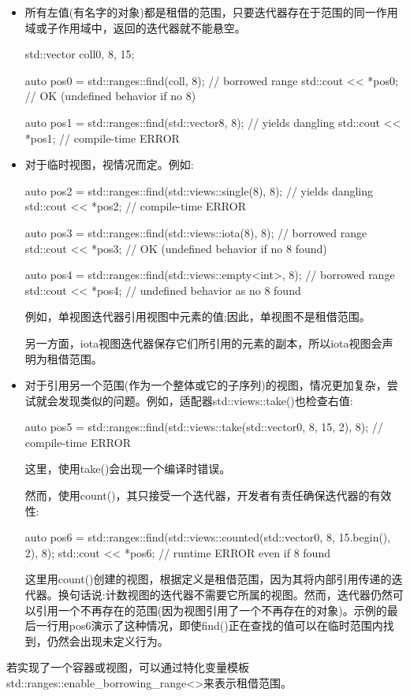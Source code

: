 \begin{itemize}
\item
所有左值(有名字的对象)都是租借的范围，只要迭代器存在于范围的同一作用域或子作用域中，返回的迭代器就不能悬空。

\begin{cpp}
std::vector coll{0, 8, 15};

auto pos0 = std::ranges::find(coll, 8); // borrowed range
std::cout << *pos0; // OK (undefined behavior if no 8)

auto pos1 = std::ranges::find(std::vector{8}, 8); // yields dangling
std::cout << *pos1; // compile-time ERROR
\end{cpp}

\item
对于临时视图，视情况而定。例如:

\begin{cpp}
auto pos2 = std::ranges::find(std::views::single(8), 8); // yields dangling
std::cout << *pos2; // compile-time ERROR

auto pos3 = std::ranges::find(std::views::iota(8), 8); // borrowed range
std::cout << *pos3; // OK (undefined behavior if no 8 found)

auto pos4 = std::ranges::find(std::views::empty<int>, 8); // borrowed range
std::cout << *pos4; // undefined behavior as no 8 found
\end{cpp}

例如，单视图迭代器引用视图中元素的值;因此，单视图不是租借范围。

另一方面，iota视图迭代器保存它们所引用的元素的副本，所以iota视图会声明为租借范围。

\item
对于引用另一个范围(作为一个整体或它的子序列)的视图，情况更加复杂，尝试就会发现类似的问题。例如，适配器std::views::take()也检查右值:

\begin{cpp}
auto pos5 = std::ranges::find(std::views::take(std::vector{0, 8, 15}, 2), 8);
// compile-time ERROR
\end{cpp}

这里，使用take()会出现一个编译时错误。

然而，使用count()，其只接受一个迭代器，开发者有责任确保迭代器的有效性:

\begin{cpp}
auto pos6 = std::ranges::find(std::views::counted(std::vector{0, 8, 15}.begin(),
							2), 8);
std::cout << *pos6; // runtime ERROR even if 8 found
\end{cpp}

这里用count()创建的视图，根据定义是租借范围，因为其将内部引用传递的迭代器。换句话说:计数视图的迭代器不需要它所属的视图。然而，迭代器仍然可以引用一个不再存在的范围(因为视图引用了一个不再存在的对象)。示例的最后一行用pos6演示了这种情况，即使find()正在查找的值可以在临时范围内找到，仍然会出现未定义行为。

\end{itemize}

若实现了一个容器或视图，可以通过特化变量模板std::ranges::enable\_borrowing\_range<>来表示租借范围。








